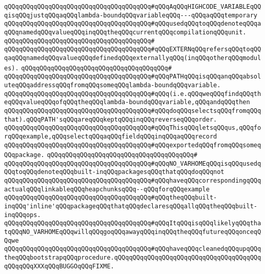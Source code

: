\verb|qQQqqQQqqQQqqQQqqQQqqQQqqQQqqQQqqQQqqQQq#qQQqAqQQqHIGHCODE_VARIABLEqQQqisqQQqjustqQQqaqQQqlambda-boundqQQqvariableqQQq---qQQqaqQQqtemporary|\newline
\verb|qQQqqQQqqQQqqQQqqQQqqQQqqQQqqQQqqQQqqQQq#qQQqusedqQQqtoqQQqdenoteqQQqaqQQqnamedqQQqvalueqQQqinqQQqtheqQQqcurrentqQQqcompilationqQQqunit.|\newline
\verb|qQQqqQQqqQQqqQQqqQQqqQQqqQQqqQQqqQQqqQQq#|\newline
\verb|qQQqqQQqqQQqqQQqqQQqqQQqqQQqqQQqqQQqqQQq#qQQqEXTERNqQQqrefersqQQqtoqQQqaqQQqnamedqQQqvalueqQQqdefinedqQQqexternallyqQQq(inqQQqotherqQQqmodules).|\newline
\verb|qQQqqQQqqQQqqQQqqQQqqQQqqQQqqQQqqQQqqQQq#|\newline
\verb|qQQqqQQqqQQqqQQqqQQqqQQqqQQqqQQqqQQqqQQq#qQQqPATHqQQqisqQQqanqQQqabsoluteqQQqaddressqQQqfromqQQqsomeqQQqlambda-boundqQQqvariable.|\newline
\verb|qQQqqQQqqQQqqQQqqQQqqQQqqQQqqQQqqQQqqQQq#qQQq(i.e.qQQqweqQQqfindqQQqtheqQQqvalueqQQqofqQQqtheqQQqlambda-boundqQQqvariable,qQQqandqQQqthen|\newline
\verb|qQQqqQQqqQQqqQQqqQQqqQQqqQQqqQQqqQQqqQQq#qQQqdoqQQqselectsqQQqfromqQQqthat).qQQqPATH'sqQQqareqQQqkeptqQQqinqQQqreverseqQQqorder.|\newline
\verb|qQQqqQQqqQQqqQQqqQQqqQQqqQQqqQQqqQQqqQQq#qQQqThisqQQqletsqQQqus,qQQqforqQQqexample,qQQqselectqQQqaqQQqfieldqQQqinqQQqaqQQqrecord|\newline
\verb|qQQqqQQqqQQqqQQqqQQqqQQqqQQqqQQqqQQqqQQq#qQQqexportedqQQqfromqQQqsomeqQQqpackage.|\newline
\verb|qQQqqQQqqQQqqQQqqQQqqQQqqQQqqQQqqQQqqQQq#|\newline
\verb|qQQqqQQqqQQqqQQqqQQqqQQqqQQqqQQqqQQqqQQq#qQQqNO_VARHOMEqQQqisqQQqusedqQQqtoqQQqdenoteqQQqbuilt-inqQQqpackagesqQQqthatqQQqdoqQQqnot|\newline
\verb|qQQqqQQqqQQqqQQqqQQqqQQqqQQqqQQqqQQqqQQq#qQQqhaveqQQqcorrespondingqQQqactualqQQqlinkableqQQqheapchunksqQQq--qQQqforqQQqexample|\newline
\verb|qQQqqQQqqQQqqQQqqQQqqQQqqQQqqQQqqQQqqQQq#qQQqtheqQQqbuilt-inqQQq'inline'qQQqpackageqQQqthatqQQqdeclaresqQQqallqQQqtheqQQqbuilt-inqQQqops.|\newline
\verb|qQQqqQQqqQQqqQQqqQQqqQQqqQQqqQQqqQQqqQQq#qQQqItqQQqisqQQqlikelyqQQqthatqQQqNO_VARHOMEqQQqwillqQQqgoqQQqawayqQQqinqQQqtheqQQqfutureqQQqonceqQQqwe|\newline
\verb|qQQqqQQqqQQqqQQqqQQqqQQqqQQqqQQqqQQqqQQq#qQQqhaveqQQqcleanedqQQqupqQQqtheqQQqbootstrapqQQqprocedure.qQQqqQQqqQQqqQQqqQQqqQQqqQQqqQQqqQQqqQQqqQQqqQQqXXXqQQqBUGGOqQQqFIXME.|\newline
